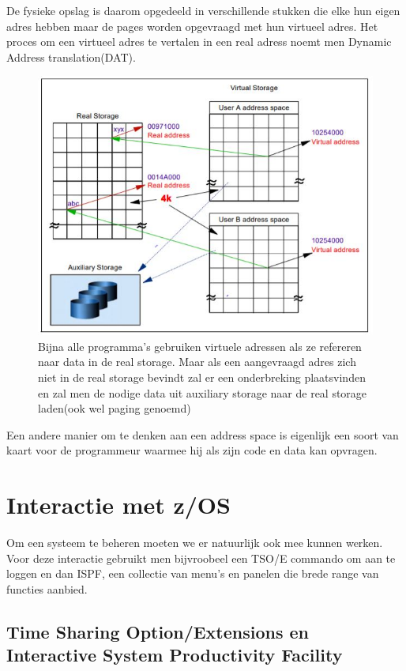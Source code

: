 De fysieke opslag is daarom opgedeeld in verschillende stukken die elke hun eigen adres hebben maar de pages worden opgevraagd met hun virtueel adres. Het proces om een virtueel adres te vertalen in een real adress noemt men Dynamic Address translation(DAT). \cite{Ebbers2011}

\begin{figure}[h]
	\centering
	\includegraphics{img/Storage}
	\caption[Visualisatie van het concept van virtuele storage]{Bijna alle programma's gebruiken virtuele adressen als ze refereren naar data in de real storage. Maar als een aangevraagd adres zich niet in de real storage bevindt zal er een onderbreking plaatsvinden en zal men de nodige data uit auxiliary storage naar de real storage laden(ook wel paging genoemd)}
	\label{fig:storage}
\end{figure}

Een andere manier om te denken aan een address space is eigenlijk een soort van kaart voor de programmeur waarmee hij als zijn code en data kan opvragen.

\section{Interactie met z/OS}
\label{sec:interactie met z/OS}

Om een systeem te beheren moeten we er natuurlijk ook mee kunnen werken. Voor deze interactie gebruikt men bijvroobeel een TSO/E commando om aan te loggen en dan ISPF, een collectie van menu's en panelen die brede range van functies aanbied.

\subsection{Time Sharing Option/Extensions en Interactive System Productivity Facility}
\label{subsec:Time Sharing Option}

